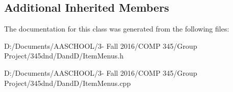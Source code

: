 \subsection*{Additional Inherited Members}


The documentation for this class was generated from the following files\+:\begin{DoxyCompactItemize}
\item 
D\+:/\+Documents/\+A\+A\+S\+C\+H\+O\+O\+L/3-\/ Fall 2016/\+C\+O\+M\+P 345/\+Group Project/345dnd/\+Dand\+D/Item\+Menus.\+h\item 
D\+:/\+Documents/\+A\+A\+S\+C\+H\+O\+O\+L/3-\/ Fall 2016/\+C\+O\+M\+P 345/\+Group Project/345dnd/\+Dand\+D/Item\+Menus.\+cpp\end{DoxyCompactItemize}
